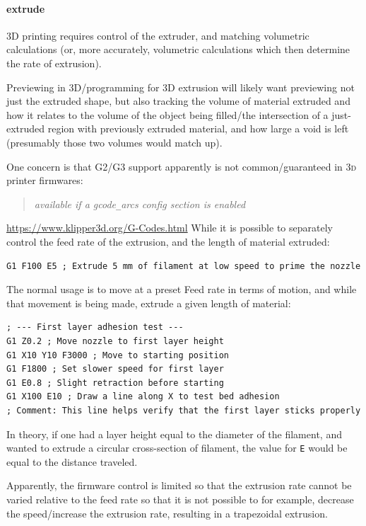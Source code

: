 \documentclass{ltxdoc}
\begin{document}
\paragraph{extrude}

3D printing requires control of the extruder, and matching volumetric calculations (or, more accurately, volumetric calculations which then determine the rate of extrusion).

Previewing in 3D/programming for 3D extrusion will likely want previewing not just the extruded shape, but also tracking the volume of material extruded and how it relates to the volume of the object being filled/the intersection of a just-extruded region with previously extruded material, and how large a void is left (presumably those two volumes would match up).

One concern is that G2/G3 support apparently is not common/guaranteed in \textsc{3d} printer firmwares:

\begin{quotation}
\emph{available if a gcode}\verb|_|\emph{arcs config section is enabled}
\end{quotation}

\noindent \url{https://www.klipper3d.org/G-Codes.html} While it is possible to separately control the feed rate of the extrusion, and the length of material extruded:

\begin{verbatim}
G1 F100 E5 ; Extrude 5 mm of filament at low speed to prime the nozzle
\end{verbatim}

The normal usage is to move at a preset Feed rate in terms of motion, and while that movement is being made, extrude a given length of material:

\begin{verbatim}
; --- First layer adhesion test ---
G1 Z0.2 ; Move nozzle to first layer height
G1 X10 Y10 F3000 ; Move to starting position
G1 F1800 ; Set slower speed for first layer
G1 E0.8 ; Slight retraction before starting
G1 X100 E10 ; Draw a line along X to test bed adhesion
; Comment: This line helps verify that the first layer sticks properly
\end{verbatim}

In theory, if one had a layer height equal to the diameter of the filament, and wanted to extrude a circular cross-section of filament, the value for \verb|E| would be equal to the distance traveled.

Apparently, the firmware control is limited so that the extrusion rate cannot be varied relative to the feed rate so that it is not possible to for example, decrease the speed/increase the extrusion rate, resulting in a trapezoidal extrusion.
\end{document}
